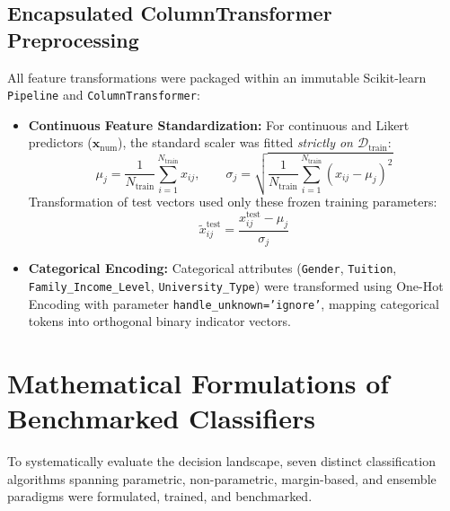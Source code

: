 \documentclass[12pt,a4paper,oneside]{report}
\begin{document}
\subsection{Encapsulated ColumnTransformer Preprocessing}
All feature transformations were packaged within an immutable Scikit-learn \texttt{Pipeline} and \texttt{ColumnTransformer}:
\begin{itemize}
    \item \textbf{Continuous Feature Standardization:} For continuous and Likert predictors ($\mathbf{x}_{\text{num}}$), the standard scaler was fitted \emph{strictly on $\mathcal{D}_{\text{train}}$}:
    \begin{equation}
        \mu_j = \frac{1}{N_{\text{train}}} \sum_{i=1}^{N_{\text{train}}} x_{ij}, \qquad \sigma_j = \sqrt{\frac{1}{N_{\text{train}}} \sum_{i=1}^{N_{\text{train}}} (x_{ij} - \mu_j)^2}
    \end{equation}
    Transformation of test vectors used only these frozen training parameters:
    \begin{equation}
        \tilde{x}_{ij}^{\text{test}} = \frac{x_{ij}^{\text{test}} - \mu_j}{\sigma_j}
    \end{equation}
    \item \textbf{Categorical Encoding:} Categorical attributes (\texttt{Gender}, \texttt{Tuition}, \texttt{Family\_Income\_Level}, \texttt{University\_Type}) were transformed using One-Hot Encoding with parameter \texttt{handle\_unknown='ignore'}, mapping categorical tokens into orthogonal binary indicator vectors.
\end{itemize}

\section{Mathematical Formulations of Benchmarked Classifiers}
\label{sec:classifier_formulations}
To systematically evaluate the decision landscape, seven distinct classification algorithms spanning parametric, non-parametric, margin-based, and ensemble paradigms were formulated, trained, and benchmarked.
\end{document}
